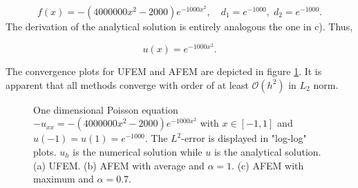 \begin{equation}
    f(x) = -(4000000x^2 - 2000)e^{-1000x^2}, \quad d_1 = e^{-1000}, \; d_2 = e^{-1000}.
\label{5d}
\end{equation}
\noindent The derivation of the analytical solution is entirely analogous the one in c). Thus,

\begin{equation}
    u(x) = e^{-1000x^2}.
\end{equation}

\noindent The convergence plots for UFEM and AFEM are depicted in figure \ref{fig:5d}. It is apparent that all methods converge with order of at least $\mathcal{O}(h^2)$ in $L_2$ norm.

\begin{figure}[!t]
  \centering
  \hfill
  \hfill
  \caption{One dimensional Poisson equation $-u_{xx} = -(4000000x^2 - 2000)e^{-1000x^2}$ with $x \in [-1,1]$ and $u(-1) = u(1) = e^{-1000}$. The $L^2$-error is displayed in "log-log" plots. $u_h$ is the numerical solution while $u$ is the analytical solution. (a) UFEM. (b) AFEM with average and $\alpha = 1$. (c) AFEM with maximum and $\alpha = 0.7$.}
  \label{fig:5d}
\end{figure}


